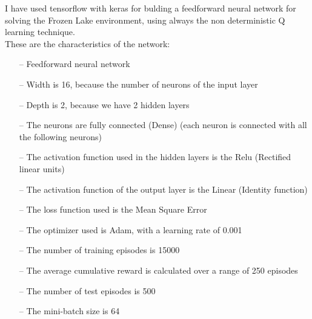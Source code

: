 \documentclass{article}
\begin{document}
\begin{center}
\centering
{}
\end{center}

\clearpage

I have used tensorflow with keras for bulding a feedforward neural network for solving the Frozen Lake environment, using always the non deterministic Q learning technique.
\\
These are the characteristics of the network:
\begin{itemize}
\item[--] Feedforward neural network
\item[--] Width is 16, because the number of neurons of the input layer
\item[--] Depth is 2, because we have 2 hidden layers
\item[--] The neurons are fully connected (Dense) (each neuron is connected with all the following neurons)
\item[--] The activation function used in the hidden layers is the Relu (Rectified linear units)
\item[--] The activation function of the output layer is the Linear (Identity function)
\item[--] The loss function used is the Mean Square Error
\item[--] The optimizer used is Adam, with a learning rate of 0.001
\item[--] The number of training episodes is 15000
\item[--] The average cumulative reward is calculated over a range of 250 episodes
\item[--] The number of test episodes is 500
\item[--] The mini-batch size is 64
\end{itemize}
\end{document}
